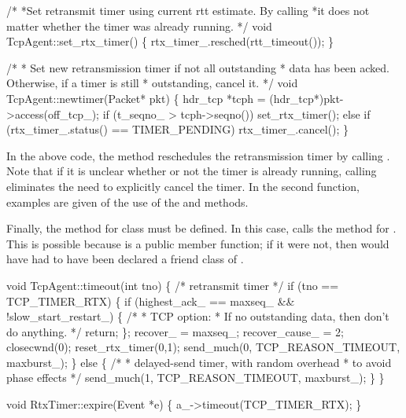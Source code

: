 \begin{program}
        /*
         *{\cf Set retransmit timer using current rtt estimate.  By calling }
         *{\cf it does not matter whether the timer was already running.}
         */
        void TcpAgent::set_rtx_timer()
        \{
            rtx_timer_.resched(rtt_timeout());
        \}

        /*
         * {\cf Set new retransmission timer if not all outstanding}
         * {\cf data has been acked.  Otherwise, if a timer is still}
         * {\cf outstanding, cancel it.}
         */
        void TcpAgent::newtimer(Packet* pkt)
        \{
            hdr_tcp *tcph = (hdr_tcp*)pkt->access(off_tcp_);
            if (t_seqno_ > tcph->seqno())
                set_rtx_timer();
            else if (rtx_timer_.status() == TIMER_PENDING)
                rtx_timer_.cancel();
        \}
\end{program}
In the above code, the  method reschedules the 
retransmission timer by calling .  Note that if
it is unclear whether or not the timer is already running, calling
 eliminates the need to explicitly cancel the timer.  In
the second function, examples are given of the use of the 
and  methods.

Finally, the  method for class  must be 
defined.  In this case,  calls the  method
for .  This is possible because  is a 
public member function; if it were not, then  would have
had to have been declared a friend class of .
\begin{program}
void TcpAgent::timeout(int tno)
\{                     
    /* retransmit timer */
    if (tno == TCP_TIMER_RTX) \{
        if (highest_ack_ == maxseq_ && !slow_start_restart_) \{
            /*
             * {\cf TCP option:}
             * {\cf If no outstanding data, then don't do anything.}
             */
            return;  
        \};
        recover_ = maxseq_;
        recover_cause_ = 2;
        closecwnd(0);
        reset_rtx_timer(0,1);
        send_much(0, TCP_REASON_TIMEOUT, maxburst_); 
    \} else \{
        /* 
         * {\cf delayed-send timer, with random overhead}
         * {\cf to avoid phase effects  }
         */     
        send_much(1, TCP_REASON_TIMEOUT, maxburst_);
    \}           
\}           
            
void RtxTimer::expire(Event *e) \{
    a_->timeout(TCP_TIMER_RTX);
\}
\end{program}

